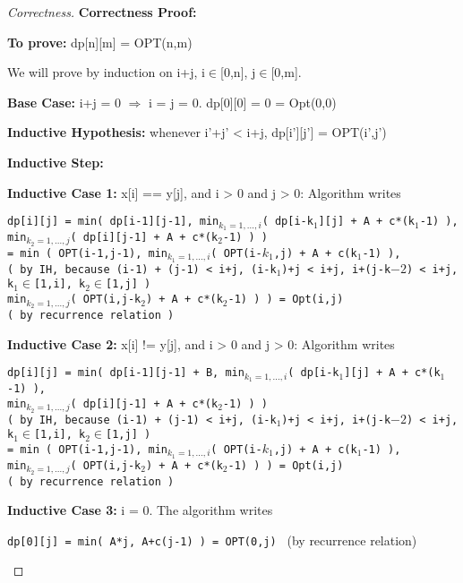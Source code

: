 \documentclass[openany]{article}
\begin{document}
\begin{proof}[Correctness]{}
    \textbf{Correctness Proof:}
    
    \textbf{To prove:} dp[n][m] = OPT(n,m)
    
    We will prove by induction on i+j, i$\in$[0,n], j$\in$[0,m].
    
    \textbf{Base Case:} i+j = 0 $\Rightarrow$ i = j = 0. dp[0][0] = 0 = Opt(0,0)
    
    \textbf{Inductive Hypothesis:} whenever i'+j' < i+j, dp[i'][j'] = OPT(i',j')
    
    \textbf{Inductive Step:}
    
    \textbf{Inductive Case 1:}  x[i] == y[j], and i > 0 and j > 0:
    Algorithm writes 
    \begin{center}
        \texttt{dp[i][j] = min( dp[i-1][j-1], min$_{k_1=1,...,i}$( dp[i-k$_1$][j] + A + c*(k$_1$-1) ),\\min$_{k_2=1,...,j}$( dp[i][j-1] + A + c*(k$_2$-1) ) )\\
        = min ( OPT(i-1,j-1), min$_{k_1=1,...,i}$( OPT(i-$k_1$,j) + A + c(k$_1$-1) ), \\( by IH, because (i-1) + (j-1) < i+j, (i-k$_1$)+j < i+j, i+(j-k$-2$) < i+j, k$_1$$\in$[1,i], k$_2$$\in$[1,j] ) \\min$_{k_2=1,...,j}$( OPT(i,j-k$_2$) + A + c*(k$_2$-1) ) ) = Opt(i,j) \\( by recurrence relation )}
    \end{center}

    \textbf{Inductive Case 2:}  x[i] != y[j], and i > 0 and j > 0:
    Algorithm writes 
    \begin{center}
        \texttt{dp[i][j] = min( dp[i-1][j-1] + B, min$_{k_1=1,...,i}$( dp[i-k$_1$][j] + A + c*(k$_1$-1) ),\\min$_{k_2=1,...,j}$( dp[i][j-1] + A + c*(k$_2$-1) ) ) \\( by IH, because (i-1) + (j-1) < i+j, (i-k$_1$)+j < i+j, i+(j-k$-2$) < i+j, k$_1$$\in$[1,i], k$_2$$\in$[1,j] )\\
= min ( OPT(i-1,j-1), min$_{k_1=1,...,i}$( OPT(i-$k_1$,j) + A + c(k$_1$-1) ), \\min$_{k_2=1,...,j}$( OPT(i,j-k$_2$) + A + c*(k$_2$-1) ) ) = Opt(i,j) \\( by recurrence relation ) }
    \end{center}

    \textbf{Inductive Case 3:} i = 0. The algorithm writes 
    \begin{center}
        \texttt{dp[0][j] = min( A*j, A+c(j-1) ) = OPT(0,j) } (by recurrence relation)
    \end{center}
    

\end{proof}
\end{document}

